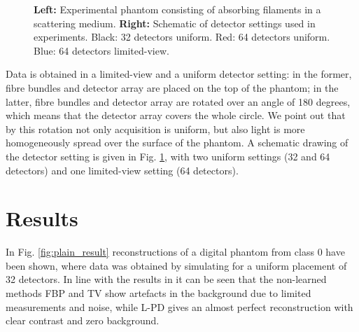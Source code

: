 \documentclass[journal]{IEEEtran}
\begin{document}
\begin{figure}[ht!]
\resizebox{\linewidth}{!}{%
\begin{tikzpicture}

\end{tikzpicture}}
\caption{\textbf{Left:} Experimental phantom consisting of absorbing filaments in a scattering medium. \textbf{Right:} Schematic of detector settings used in experiments. Black: 32 detectors uniform. Red: 64 detectors uniform. Blue: 64 detectors limited-view.}
\label{fig:exp_photo}
\end{figure}

Data is obtained in a limited-view and a uniform detector setting: in the former, fibre bundles and detector array are placed on the top of the phantom; in the latter, fibre bundles and detector array are rotated over an angle of 180 degrees, which means that the detector array covers the whole circle. We point out that by this rotation not only acquisition is uniform, but also light is more homogeneously spread over the surface of the phantom. A schematic drawing of the detector setting is given in Fig. \ref{fig:exp_photo}, with two uniform settings (32 and 64 detectors) and one limited-view setting (64 detectors). 

\section{Results}\label{sec:results}
In Fig. \ref{fig:plain_result} reconstructions of a digital phantom from class 0 have been shown, where data was obtained by simulating for a uniform placement of 32 detectors. In line with the results in \cite{Adler2018} it can be seen that the non-learned methods FBP and TV show artefacts in the background due to limited measurements and noise, while L-PD gives an almost perfect reconstruction with clear contrast and zero background.
\end{document}

